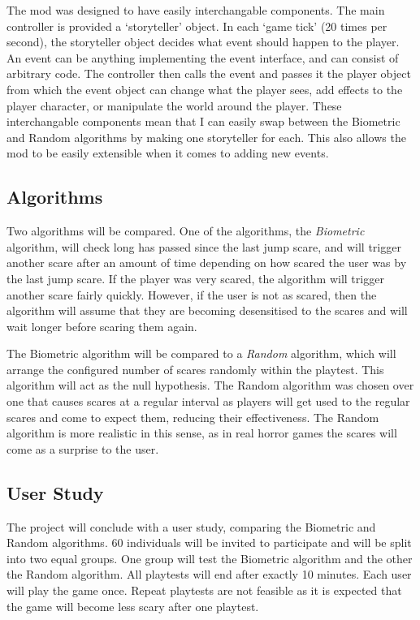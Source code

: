 \documentclass[12pt,a4paper]{article}
\begin{document}
The mod was designed to have easily interchangable components. The main controller is provided a `storyteller' object. In each `game tick' (20 times per second), the storyteller object decides what event should happen to the player. An event can be anything implementing the event interface, and can consist of arbitrary code. The controller then calls the event and passes it the player object from which the event object can change what the player sees, add effects to the player character, or manipulate the world around the player. These interchangable components mean that I can easily swap between the Biometric and Random algorithms by making one storyteller for each. This also allows the mod to be easily extensible when it comes to adding new events.

\FloatBarrier

\subsection{Algorithms}
Two algorithms will be compared. One of the algorithms, the \emph{Biometric} algorithm, will check long has passed since the last jump scare, and will trigger another scare after an amount of time depending on how scared the user was by the last jump scare. If the player was very scared, the algorithm will trigger another scare fairly quickly. However, if the user is not as scared, then the algorithm will assume that they are becoming desensitised to the scares and will wait longer before scaring them again.

The Biometric algorithm will be compared to a \emph{Random} algorithm, which will arrange the configured number of scares randomly within the playtest. This algorithm will act as the null hypothesis. The Random algorithm was chosen over one that causes scares at a regular interval as players will get used to the regular scares and come to expect them, reducing their effectiveness. The Random algorithm is more realistic in this sense, as in real horror games the scares will come as a surprise to the user.

\subsection{User Study}
The project will conclude with a user study, comparing the Biometric and Random algorithms. 60 individuals will be invited to participate and will be split into two equal groups. One group will test the Biometric algorithm and the other the Random algorithm. All playtests will end after exactly 10 minutes. Each user will play the game once. Repeat playtests are not feasible as it is expected that the game will become less scary after one playtest.
\end{document}
